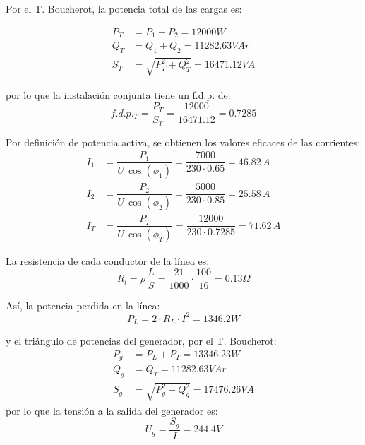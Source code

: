 Por el T. Boucherot, la potencia total de las cargas es:

\begin{align*}
  P_T&=P_1+P_2 = 12000W\\
  Q_T&=Q_1+Q_2 = 11282.63VAr\\
  S_T&=\sqrt{P_T^2+Q_T^2}=16471.12VA
\end{align*}

por lo que la instalación conjunta tiene un f.d.p. de:
\begin{equation*}
  f.d.p._T=\dfrac{P_T}{S_T}=\dfrac{12000}{16471.12}=0.7285
\end{equation*}

Por definición de potencia activa, se obtienen los valores eficaces de
las corrientes:
\begin{align*}
  I_1&=\dfrac{P_1}{U\,\cos(\phi_1)}=\dfrac{7000}{230\cdot
       0.65}=46.82\,A\\
  I_2&=\dfrac{P_2}{U\,\cos(\phi_2)}=\dfrac{5000}{230\cdot
       0.85}=25.58\,A\\
  I_T&=\dfrac{P_T}{U\,\cos(\phi_T)}=\dfrac{12000}{230\cdot
       0.7285}=71.62\,A
\end{align*}

La resistencia de cada conductor de la línea es:
\begin{equation*}
  R_l=\rho\,\dfrac{L}{S}=\dfrac{21}{1000}\cdot
  \dfrac{100}{16}=0.13\Omega
\end{equation*}

Así, la potencia perdida en la línea:
\begin{equation*}
  P_L= 2 \cdot R_L \cdot I^2=1346.2W
\end{equation*}

y el triángulo de potencias del generador, por el T. Boucherot:
\begin{align*}
  P_g&=P_L+P_T= 13346.23 W\\ Q_g&=Q_T=11282.63 VAr\\
  S_g&=\sqrt{P_g^2+Q_g^2}=17476.26 VA
\end{align*} por lo que
la tensión a la salida del generador es:
\begin{equation*}
  U_g=\dfrac{S_g}{I}=244.4 V
\end{equation*}

